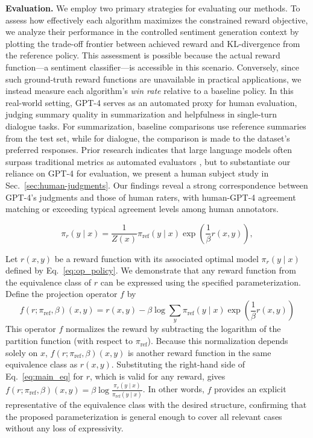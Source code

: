 \textbf{Evaluation.} We employ two primary strategies for evaluating our methods. To assess how effectively each algorithm maximizes the constrained reward objective, we analyze their performance in the controlled sentiment generation context by plotting the trade-off frontier between achieved reward and KL-divergence from the reference policy. This assessment is possible because the actual reward function—a sentiment classifier—is accessible in this scenario. Conversely, since such ground-truth reward functions are unavailable in practical applications, we instead measure each algorithm's \textit{win rate} relative to a baseline policy. In this real-world setting, GPT-4 serves as an automated proxy for human evaluation, judging summary quality in summarization and helpfulness in single-turn dialogue tasks. For summarization, baseline comparisons use reference summaries from the test set, while for dialogue, the comparison is made to the dataset’s preferred responses. Prior research indicates that large language models often surpass traditional metrics as automated evaluators \citep{Chen2023ExploringTU}, but to substantiate our reliance on GPT-4 for evaluation, we present a human subject study in Sec.~\ref{sec:human-judgments}. Our findings reveal a strong correspondence between GPT-4's judgments and those of human raters, with human-GPT-4 agreement matching or exceeding typical agreement levels among human annotators.

\begin{equation}\label{eq:op_policy}
    \pi_r(y\mid x) = \frac{1}{Z(x)}\pi_\text{ref}(y\mid x)\exp\left(\frac{1}{\beta}r(x, y)\right),
\end{equation}

\begin{sproof}
    Let $r(x, y)$ be a reward function with its associated optimal model $\pi_r(y \mid x)$ defined by Eq.~\ref{eq:op_policy}. We demonstrate that any reward function from the equivalence class of $r$ can be expressed using the specified parameterization. Define the projection operator $f$ by
\begin{equation}
    f(r; \pi_\text{ref}, \beta)(x, y) = r(x, y) - \beta\log\sum_{y}\pi_\text{ref}(y\mid x)\exp\left(\frac{1}{\beta}r(x, y)\right)
\end{equation}
This operator $f$ normalizes the reward by subtracting the logarithm of the partition function (with respect to $\pi_\text{ref}$). Because this normalization depends solely on $x$, $f(r; \pi_\text{ref}, \beta)(x, y)$ is another reward function in the same equivalence class as $r(x, y)$. Substituting the right-hand side of Eq.~\ref{eq:main_eq} for $r$, which is valid for any reward, gives $f(r; \pi_\text{ref}, \beta)(x, y) = \beta \log \frac{\pi_r(y\mid x)}{\pi_\text{ref}(y\mid x)}$. In other words, $f$ provides an explicit representative of the equivalence class with the desired structure, confirming that the proposed parameterization is general enough to cover all relevant cases without any loss of expressivity.
\end{sproof}

